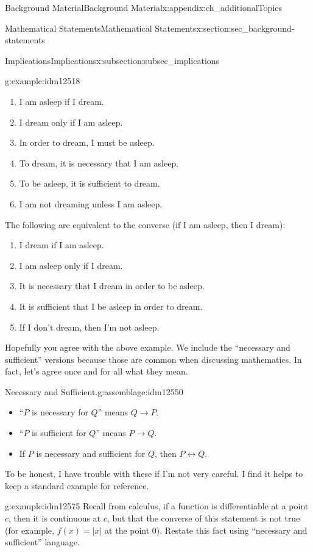 \documentclass[oneside,10pt,]{book}
\numberwithin{equation}{chapter}
\def\iff{\leftrightarrow}
\def\imp{\rightarrow}
\begin{document}
\begin{appendixptx}{Background Material}{}{Background Material}{}{}{x:appendix:ch_additionalTopics}
\begin{sectionptx}{Mathematical Statements}{}{Mathematical Statements}{}{}{x:section:sec_background-statements}
\begin{subsectionptx}{Implications}{}{Implications}{}{}{x:subsection:subsec_implications}
\begin{example}{}{g:example:idm12518}
\begin{enumerate}
\item{}I am asleep if I dream.%
\item{}I dream only if I am asleep.%
\item{}In order to dream, I must be asleep.%
\item{}To dream, it is necessary that I am asleep.%
\item{}To be asleep, it is sufficient to dream.%
\item{}I am not dreaming unless I am asleep.%
\end{enumerate}
The following are equivalent to the converse (if I am asleep, then I dream):%
\begin{enumerate}
\item{}I dream if I am asleep.%
\item{}I am asleep only if I dream.%
\item{}It is necessary that I dream in order to be asleep.%
\item{}It is sufficient that I be asleep in order to dream.%
\item{}If I don't dream, then I'm not asleep.%
\end{enumerate}
%
\end{example}
Hopefully you agree with the above example. We include the ``necessary and sufficient'' versions because those are common when discussing mathematics. In fact, let's agree once and for all what they mean.%
\begin{assemblage}{Necessary and Sufficient.}{g:assemblage:idm12550}%
\par
%
\begin{itemize}[label=\textbullet]
\item{}``\(P\) is necessary for \(Q\)'' means \(Q \imp P\).%
\item{}``\(P\) is sufficient for \(Q\)'' means \(P \imp Q\).%
\item{}If \(P\) is necessary and sufficient for \(Q\), then \(P \iff Q\).%
\end{itemize}
%
\end{assemblage}
To be honest, I have trouble with these if I'm not very careful. I find it helps to keep a standard example for reference.%
\begin{example}{}{g:example:idm12575}%
Recall from calculus, if a function is differentiable at a point \(c\), then it is continuous at \(c\), but that the converse of this statement is not true (for example, \(f(x) = |x|\) at the point 0). Restate this fact using ``necessary and sufficient'' language.%

\end{example}
\end{subsectionptx}
\end{sectionptx}
\end{appendixptx}
\end{document}
